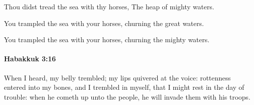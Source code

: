 			\begin{versebox}
					\item[BHS] 
					\item[LXX] 
					\item[ASV] Thou didst tread the sea with thy horses, The heap of mighty waters.
					\item[NIV] You trampled the sea with your horses, churning the great waters.
					\item[NRSV] You trampled the sea with your horses, churning the mighty waters.
			\end{versebox}

		\paragraph{Habakkuk 3:16} %
			\label{HABAKKUK-3-16}

			When I heard, my belly trembled; my lips quivered at the voice: rottenness entered into my bones, and I trembled in myself, that I might rest in the day of trouble: when he cometh up unto the people, he will invade them with his troops.

